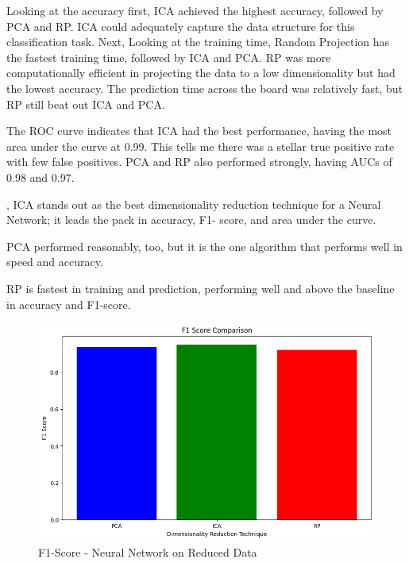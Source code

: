 \documentclass[conference]{IEEEtran}
\begin{document}
\par Looking at the accuracy first, ICA achieved the highest accuracy, followed by PCA and RP. ICA could adequately capture the data structure for this classification task. Next, Looking at the training time, Random Projection has the fastest training time, followed by ICA and PCA. RP was more computationally efficient in projecting the data to a low dimensionality but had the lowest accuracy. The prediction time across the board was relatively fast, but RP still beat out ICA and PCA. 
\par The ROC curve indicates that ICA had the best performance, having the most area under the curve at 0.99. This tells me there was a stellar true positive rate with few false positives. PCA and RP also performed strongly, having AUCs of 0.98 and 0.97. 
\par, ICA stands out as the best dimensionality reduction technique for a Neural Network; it leads the pack in accuracy, F1- score, and area under the curve.
\par PCA performed reasonably, too, but it is the one algorithm that performs well in speed and accuracy.
\par RP is fastest in training and prediction, performing well and above the baseline in accuracy and F1-score.
\begin{figure}
    \centering
    \includegraphics[width=1\linewidth]{figures//housing_figures/f1_dim_reduction.png}
    \caption{F1-Score - Neural Network on Reduced Data}
    \label{fig:enter-label}
\end{figure}
\end{document}

